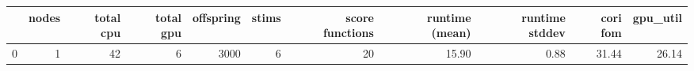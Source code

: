 \begin{tabular}{lrrrrrrrrrr}
\toprule
{} &  nodes &  total cpu &  total gpu &  offspring &  stims &  score functions & runtime (mean) & runtime stddev & cori fom & gpu\_util \\
\midrule
0 &      1 &         42 &          6 &       3000 &      6 &               20 &          15.90 &           0.88 &    31.44 &    26.14 \\
\bottomrule
\end{tabular}
